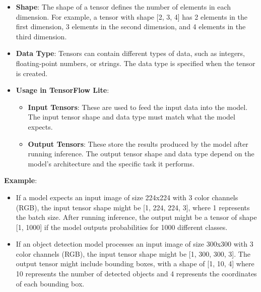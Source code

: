 \begin{itemize} 
    
    \item \textbf{Shape}: The shape of a tensor defines the number of elements in each dimension. For example, a tensor with shape [2, 3, 4] has 2 elements in the first dimension, 3 elements in the second dimension, and 4 elements in the third dimension.
    
    \item \textbf{Data Type}: Tensors can contain different types of data, such as integers, floating-point numbers, or strings. The data type is specified when the tensor is created.
    
    \item \textbf{Usage in TensorFlow Lite}:
    \begin{itemize}
        \item \textbf{Input Tensors}: These are used to feed the input data into the model. The input tensor shape and data type must match what the model expects.
        \item \textbf{Output Tensors}: These store the results produced by the model after running inference. The output tensor shape and data type depend on the model's architecture and the specific task it performs.
    \end{itemize}
\end{itemize}

\textbf{Example}:
\begin{itemize}
    \item If a model expects an input image of size 224x224 with 3 color channels (RGB), the input tensor shape might be [1, 224, 224, 3], where 1 represents the batch size. After running inference, the output might be a tensor of shape [1, 1000] if the model outputs probabilities for 1000 different classes.
    \item If an object detection model processes an input image of size 300x300 with 3 color channels (RGB), the input tensor shape might be [1, 300, 300, 3]. The output tensor might include bounding boxes, with a shape of [1, 10, 4] where 10 represents the number of detected objects and 4 represents the coordinates of each bounding box.
\end{itemize}


